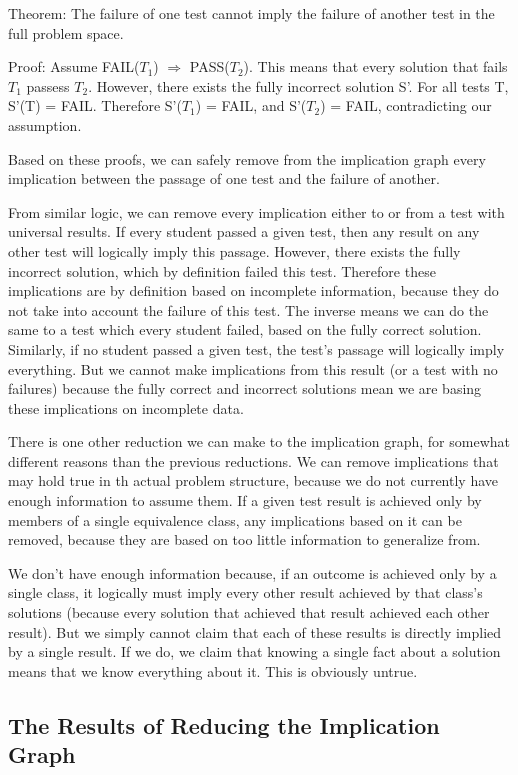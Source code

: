 \documentclass[11pt,twoside]{article}
\begin{document}
Theorem: The failure of one test cannot imply the failure of another test in the full problem space.

Proof: Assume FAIL($T_1$) $\Rightarrow$ PASS($T_2$). This means that every solution that fails $T_1$ passess $T_2$. However, there exists the fully incorrect solution S'. For all tests T, S'(T) = FAIL. Therefore S'($T_1$) = FAIL, and S'($T_2$) = FAIL, contradicting our assumption.


Based on these proofs, we can safely remove from the implication graph every implication between the passage of one test and the failure of another.

From similar logic, we can remove every implication either to or from a test with universal results. If every student passed a given test, then any result on any other test will logically imply this passage. However, there exists the fully incorrect solution, which by definition failed this test. Therefore these implications are by definition based on incomplete information, because they do not take into account the failure of this test. The inverse means we can do the same to a test which every student failed, based on the fully correct solution. Similarly, if no student passed a given test, the  test's passage will logically imply everything. But we cannot make implications  from this result (or a test with no failures) because the fully correct and incorrect solutions mean we are basing these implications on incomplete data.

There is one other reduction we can make to the implication graph, for somewhat different reasons than the previous reductions. We can remove implications that may hold true in th actual problem structure, because we do not currently have enough information to assume them. If a given test result is achieved only by members of a single equivalence class, any implications based on it can be removed, because they are based on too little information to generalize from.

We don't have enough information because, if an outcome is achieved only by a single class, it logically must imply every other result achieved by that class's solutions (because every solution that achieved that result achieved each other result). But we simply cannot claim that each of these results is directly implied by a single result. If we do, we claim that knowing a single fact about a solution means that we know everything about it. This is obviously untrue.

\subsection{The Results  of Reducing the Implication Graph}
\end{document}
